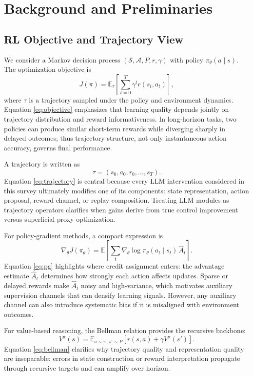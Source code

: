 ﻿\documentclass[conference]{IEEEtran}
\begin{document}
\section{Background and Preliminaries}
\subsection{RL Objective and Trajectory View}
We consider a Markov decision process $(\mathcal{S},\mathcal{A},P,r,\gamma)$ with policy $\pi_\theta(a\mid s)$. The optimization objective is
\begin{equation}
J(\pi)=\mathbb{E}_{\tau}\left[\sum_{t=0}^{T}\gamma^t r(s_t,a_t)\right],
\label{eq:objective}
\end{equation}
where $\tau$ is a trajectory sampled under the policy and environment dynamics. Equation \eqref{eq:objective} emphasizes that learning quality depends jointly on trajectory distribution and reward informativeness. In long-horizon tasks, two policies can produce similar short-term rewards while diverging sharply in delayed outcomes; thus trajectory structure, not only instantaneous action accuracy, governs final performance.

A trajectory is written as
\begin{equation}
\tau=(s_0,a_0,r_0,\ldots,s_T).
\label{eq:trajectory}
\end{equation}
Equation \eqref{eq:trajectory} is central because every LLM intervention considered in this survey ultimately modifies one of its components: state representation, action proposal, reward channel, or replay composition. Treating LLM modules as trajectory operators clarifies when gains derive from true control improvement versus superficial proxy optimization.

For policy-gradient methods, a compact expression is
\begin{equation}
\nabla_{\theta}J(\pi_\theta)=\mathbb{E}\left[\sum_t \nabla_{\theta}\log\pi_\theta(a_t\mid s_t)\,\hat{A}_t\right].
\label{eq:pg}
\end{equation}
Equation \eqref{eq:pg} highlights where credit assignment enters: the advantage estimate $\hat{A}_t$ determines how strongly each action affects updates. Sparse or delayed rewards make $\hat{A}_t$ noisy and high-variance, which motivates auxiliary supervision channels that can densify learning signals. However, any auxiliary channel can also introduce systematic bias if it is misaligned with environment outcomes.

For value-based reasoning, the Bellman relation provides the recursive backbone:
\begin{equation}
V^{\pi}(s)=\mathbb{E}_{a\sim\pi,\,s'\sim P}\left[r(s,a)+\gamma V^{\pi}(s')\right].
\label{eq:bellman}
\end{equation}
Equation \eqref{eq:bellman} clarifies why trajectory quality and representation quality are inseparable: errors in state construction or reward interpretation propagate through recursive targets and can amplify over horizon.
\end{document}
